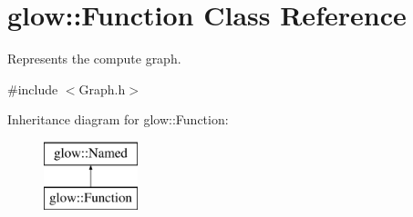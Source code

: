 \hypertarget{classglow_1_1_function}{}\section{glow\+:\+:Function Class Reference}
\label{classglow_1_1_function}


Represents the compute graph.  




{\ttfamily \#include $<$Graph.\+h$>$}

Inheritance diagram for glow\+:\+:Function\+:\begin{figure}[H]
\begin{center}
\leavevmode
\includegraphics[height=2.000000cm]{classglow_1_1_function}
\end{center}
\end{figure}
